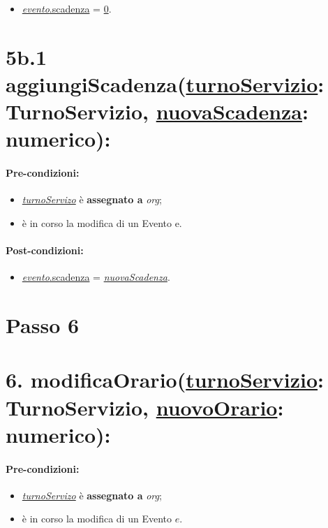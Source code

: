 \begin{itemize}
    \item \underline{\textit{evento}.scadenza} = \underline{0}.
\end{itemize}

\section*{5b.1 aggiungiScadenza(\underline{turnoServizio}: TurnoServizio, \underline{nuovaScadenza}: numerico):}

\paragraph{Pre-condizioni:}
\begin{itemize}
     \item \underline{\textit{turnoServizo}} è \textbf{assegnato a} {\textit{org}};
    \item è in corso la modifica di un Evento e.
\end{itemize}

\paragraph{Post-condizioni:}

\begin{itemize}
    \item \underline{\textit{evento}.scadenza} = \underline{\textit{nuovaScadenza}}.
\end{itemize}

\section{Passo 6}
\section*{6. modificaOrario(\underline{turnoServizio}: TurnoServizio, \underline{nuovoOrario}: numerico):}

\paragraph{Pre-condizioni:}
\begin{itemize}
     \item \underline{\textit{turnoServizo}} è \textbf{assegnato a} {\textit{org}};
    \item è in corso la modifica di un Evento $e$.
\end{itemize}

